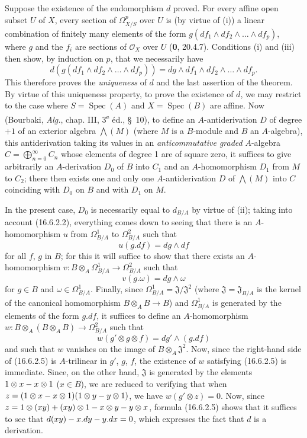 Suppose the existence of the endomorphism $d$ proved. For every affine open
subset $U$ of $X$, every section of $\varOmega_{X/S}^p$ over $U$ is (by virtue
of (i)) a linear combination of finitely many elements of the form
$g(df_1\wedge df_2\wedge\ldots\wedge df_p)$, where $g$ and the $f_i$ are
sections of $\mathcal{O}_X$ over $U$ (\textbf{0}, 20.4.7). Conditions (i)
and (iii) then show, by induction on $p$, that we necessarily have
\[
  d(g(df_1\wedge df_2\wedge\ldots\wedge df_p))
  =dg\wedge df_1\wedge df_2\wedge\ldots\wedge df_p.
  \tag{16.6.2.2}
  \label{IV.16.6.2.2}
\]
This therefore proves the \emph{uniqueness} of $d$ and the last assertion of the
theorem. By virtue of this uniqueness property, to prove the existence of $d$, we
may restrict to the case where $S=\operatorname{Spec}(A)$ and
$X=\operatorname{Spec}(B)$ are affine. Now (Bourbaki, \emph{Alg.}, chap.
III, 3\textsuperscript{e} éd., \S~10), to define an $A$-antiderivation
$D$ of degree $+1$ of an exterior algebra $\bigwedge(M)$ (where $M$ is a
$B$-module and $B$ an $A$-algebra), this antiderivation taking its values
in an \emph{anticommutative graded} $A$-algebra
$C=\bigoplus_{n=0}^{\infty}C_n$ whose elements of degree 1 are of square
zero, it suffices to give arbitrarily an $A$-derivation $D_0$ of $B$
into $C_1$ and an $A$-homomorphism $D_1$ from $M$ to $C_2$; there then exists
one and only one $A$-antiderivation $D$ of $\bigwedge(M)$ into $C$
coinciding with $D_0$ on $B$ and with $D_1$ on $M$.

In the present case, $D_0$ is necessarily equal to $d_{B/A}$ by virtue of
(ii); taking into account (16.6.2.2), everything comes down to seeing that there
is an $A$-homomorphism $u$ from $\Omega_{B/A}^1$ to $\Omega_{B/A}^2$ such that
\[
  u(g.df)=dg\wedge df
  \tag{16.6.2.3}
  \label{IV.16.6.2.3}
\]
for all $f$, $g$ in $B$; for this it will suffice to show that there
exists an $A$-homomorphism
$v:B\otimes_A\Omega_{B/A}^1\to\Omega_{B/A}^2$ such that
\[
  v(g.\omega)=dg\wedge\omega
  \tag{16.6.2.4}
  \label{IV.16.6.2.4}
\]
for $g\in B$ and $\omega\in\Omega_{B/A}^1$. Finally, since
$\Omega_{B/A}^1=\mathfrak{J}/\mathfrak{J}^2$ (where
$\mathfrak{J}=\mathfrak{J}_{B/A}$ is the kernel of the canonical homomorphism
$B\otimes_A B\to B$) and $\Omega_{B/A}^1$ is generated by the elements
of the form $g.df$, it suffices to define an $A$-homomorphism
$w:B\otimes_A(B\otimes_A B)\to\Omega_{B/A}^2$ such that
\[
  w(g'\otimes g\otimes f)=dg'\wedge(g.df)
  \tag{16.6.2.5}
  \label{IV.16.6.2.5}
\]
and such that $w$ vanishes on the image of $B\otimes_A\mathfrak{J}^2$. Now,
since the right-hand side of (16.6.2.5) is $A$-trilinear in $g'$, $g$, $f$,
the existence of $w$ satisfying (16.6.2.5) is immediate. Since, on the other hand,
$\mathfrak{J}$ is generated by the elements $1\otimes x- x\otimes1$
($x\in B$), we are reduced to verifying that when
$z=(1\otimes x- x\otimes1)(1\otimes y- y\otimes1)$, we have
$w(g'\otimes z)=0$. Now, since
$z=1\otimes(xy)+(xy)\otimes1- x\otimes y- y\otimes x$, formula (16.6.2.5)
shows that it
suffices to see that $d(xy)- x.dy- y.dx=0$, which expresses the fact that $d$ is a
derivation.

